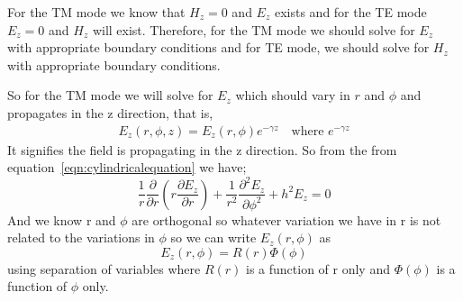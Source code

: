 For the TM mode we know that $H_z=0$ and $E_z$ exists and for the TE mode $E_z=0$ and $H_z$ will exist. Therefore, for the TM mode we should solve for $E_z$ with appropriate boundary conditions and for TE mode, we should solve for $H_z$ with appropriate boundary conditions. 

So for the TM mode we will solve for $E_z$ which should vary in $r$ and $\phi$ and propagates in the z direction, that is,
\begin{align*}
E_z(r,\phi, z)=E_z(r,\phi)e^{-\gamma z}\quad\text{where }e^{-\gamma z}
\end{align*}
It signifies the field is propagating in the z direction. So from the from equation~\eqref{eqn:cylindricalequation} we have;
\begin{equation}
\frac{1}{r}\frac{\partial}{\partial r}(r\frac{\partial E_z}{\partial r}) + \frac{1}{r^2}\frac{\partial^2 E_z}{\partial\phi^2} + h^2 E_z = 0 
\label{eqn12.3}
\end{equation}
And we know r and $\phi$ are orthogonal so whatever variation we have in r is not related to the variations in $\phi$ so we can write $E_z(r, \phi)$ as
$$
E_z(r, \phi) = R(r)\Phi(\phi) 
$$
using separation of variables where $R(r)$ is a function of r only and $\Phi(\phi)$ is a function of $\phi$ only.

